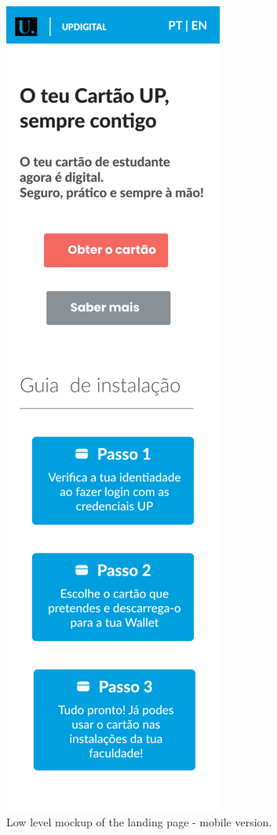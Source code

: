 \documentclass[10pt]{article}
\begin{document}
\begin{figure}[H]
\begin{minipage}{0.18\textwidth}
    \includegraphics[width=\linewidth]{report-images/landing-page-mobile.png}
    \caption{Low level mockup of the landing page - mobile version.}
    \label{fig:fig-9}
  \end{minipage}
\end{figure}
\end{document}
